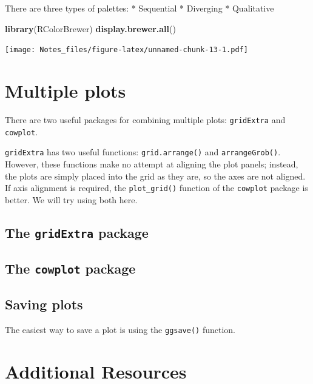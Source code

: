 \documentclass[
]{book}
\newenvironment{Shaded}{\begin{snugshade}}{\end{snugshade}}
\newcommand{\KeywordTok}[1]{\textcolor[rgb]{0.13,0.29,0.53}{\textbf{#1}}}
\newcommand{\NormalTok}[1]{#1}
\begin{document}
There are three types of palettes:
* Sequential
* Diverging
* Qualitative

\begin{Shaded}
\begin{Highlighting}[]
\KeywordTok{library}\NormalTok{(RColorBrewer)}
\KeywordTok{display.brewer.all}\NormalTok{()}
\end{Highlighting}
\end{Shaded}

\texttt{[image: Notes\_files/figure-latex/unnamed-chunk-13-1.pdf]}

\hypertarget{multiple-plots}{%
\section{Multiple plots}\label{multiple-plots}}

There are two useful packages for combining multiple plots: \texttt{gridExtra} and \texttt{cowplot}.

\texttt{gridExtra} has two useful functions: \texttt{grid.arrange()} and \texttt{arrangeGrob()}. However, these functions make no attempt at aligning the plot panels; instead, the plots are simply placed into the grid as they are, so the axes are not aligned. If axis alignment is required, the \texttt{plot\_grid()} function of the \texttt{cowplot} package is better. We will try using both here.

\hypertarget{the-gridextra-package}{%
\subsection{\texorpdfstring{The \texttt{gridExtra} package}{The gridExtra package}}\label{the-gridextra-package}}

\hypertarget{the-cowplot-package}{%
\subsection{\texorpdfstring{The \texttt{cowplot} package}{The cowplot package}}\label{the-cowplot-package}}

\hypertarget{saving-plots}{%
\subsection{Saving plots}\label{saving-plots}}

The easiest way to save a plot is using the \texttt{ggsave()} function.

\hypertarget{additional-resources}{%
\section{Additional Resources}\label{additional-resources}}
\end{document}
